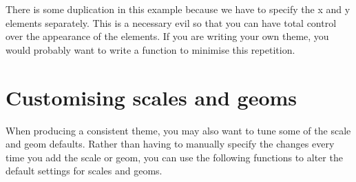% 


There is some duplication in this example because we have to specify the x and y elements separately.  This is a necessary evil so that you can have total control over the appearance of the elements.  If you are writing your own theme, you would probably want to write a function to minimise this repetition.

% 
% 
% 
% 
% 

\section{Customising scales and geoms}
\label{sec:theme-scale-geom}

When producing a consistent theme, you may also want to tune some of the scale and geom defaults.  Rather than having to manually specify the changes every time you add the scale or geom, you can use the following functions to alter the default settings for scales and geoms.


